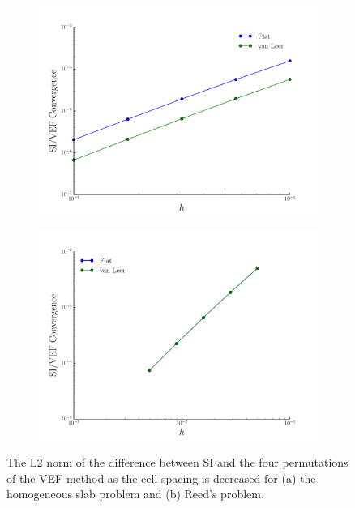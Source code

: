 	\begin{figure}
		\centering
		\begin{subfigure}{.5\textwidth}
			\centering
			\includegraphics[width=\textwidth]{figs/solconv_homo.pdf}
			\caption{}
			\label{fig:homo}
		\end{subfigure}
		\hspace{-2em}
		\begin{subfigure}{.5\textwidth}
			\centering
			\includegraphics[width=\textwidth]{figs/solconv_reed.pdf}
			\caption{}
			\label{fig:reed}
		\end{subfigure}
		\caption{The L2 norm of the difference between SI and the four permutations of the VEF method as the cell spacing is decreased for (a) the homogeneous slab problem and (b) Reed's problem. }
	\end{figure}

